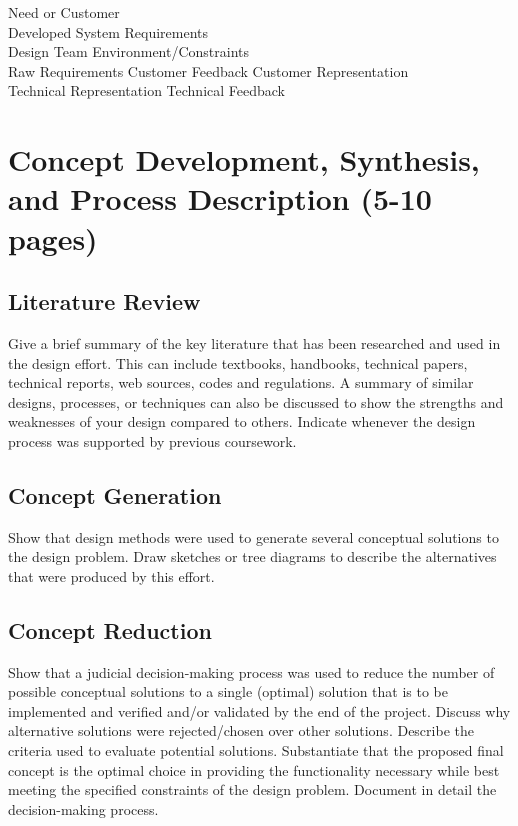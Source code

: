 \documentclass[12pt]{article}
\begin{document}
\begin{center}
Need or Customer \\
Developed System Requirements \\
Design Team Environment/Constraints \\
Raw Requirements \quad Customer Feedback \quad Customer Representation \\
Technical Representation \quad Technical Feedback
\end{center}

\section{Concept Development, Synthesis, and Process Description (5-10 pages)}
\subsection{Literature Review}
Give a brief summary of the key literature that has been researched and used in the design effort. This can include textbooks, handbooks, technical papers, technical reports, web sources, codes and regulations. A summary of similar designs, processes, or techniques can also be discussed to show the strengths and weaknesses of your design compared to others. Indicate whenever the design process was supported by previous coursework.

\subsection{Concept Generation}
Show that design methods were used to generate several conceptual solutions to the design problem. Draw sketches or tree diagrams to describe the alternatives that were produced by this effort.

\subsection{Concept Reduction}
Show that a judicial decision-making process was used to reduce the number of possible conceptual solutions to a single (optimal) solution that is to be implemented and verified and/or validated by the end of the project. Discuss why alternative solutions were rejected/chosen over other solutions. Describe the criteria used to evaluate potential solutions. Substantiate that the proposed final concept is the optimal choice in providing the functionality necessary while best meeting the specified constraints of the design problem. Document in detail the decision-making process.
\end{document}
